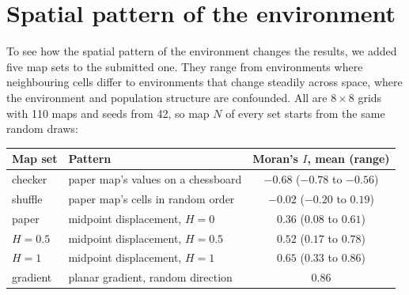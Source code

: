 

\section{Spatial pattern of the environment}
\label{sec:spatial}

To see how the spatial pattern of the environment changes the results, we
added five map sets to the submitted one. They range from environments
where neighbouring cells differ to environments that change steadily
across space, where the environment and population structure are
confounded. All are $8\times8$ grids with 110 maps and seeds from 42, so map
$N$ of every set starts from the same random draws:

\begin{center}
\begin{tabular}{llc}
\toprule
Map set & Pattern & Moran's $I$, mean (range) \\
\midrule
checker & paper map's values on a chessboard & $-0.68$ ($-0.78$ to $-0.56$) \\
shuffle & paper map's cells in random order & $-0.02$ ($-0.20$ to $0.19$) \\
paper & midpoint displacement, $H=0$ & $0.36$ ($0.08$ to $0.61$) \\
$H=0.5$ & midpoint displacement, $H=0.5$ & $0.52$ ($0.17$ to $0.78$) \\
$H=1$ & midpoint displacement, $H=1$ & $0.65$ ($0.33$ to $0.86$) \\
gradient & planar gradient, random direction & $0.86$ \\
\bottomrule
\end{tabular}
\end{center}

